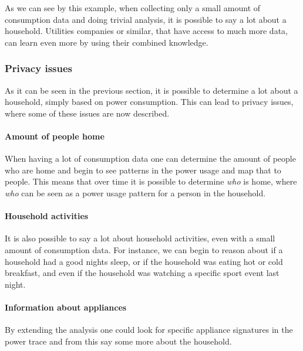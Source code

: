 As we can see by this example, when collecting only a small amount of consumption data and doing trivial analysis, it is possible to say a lot about a household.
Utilities companies or similar, that have access to much more data, can learn even more by using their combined knowledge.

\subsubsection{Privacy issues}\label{privacy_concerns}
As it can be seen in the previous section, it is possible to determine a lot about a household, simply based on power consumption.
This can lead to privacy issues, where some of these issues are now described.

\paragraph{Amount of people home}
When having a lot of consumption data one can determine the amount of people who are home and begin to see patterns in the power usage and map that to people.
This means that over time it is possible to determine \textit{who} is home, where \textit{who} can be seen as a power usage pattern for a person in the household.

\paragraph{Household activities}
  
It is also possible to say a lot about household activities, even with a small amount of consumption data.
For instance, we can begin to reason about if a household had a good nights sleep, or if the household was eating hot or cold breakfast, and even if the household was watching a specific sport event last night.
\paragraph{Information about appliances}
By extending the analysis one could look for specific appliance signatures in the power trace and from this say some more about the household.



